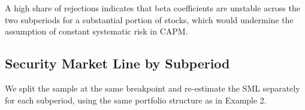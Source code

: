 \documentclass[
]{article}
\begin{document}
A high share of rejections indicates that beta coefficients are unstable across the two
subperiods for a substantial portion of stocks, which would undermine the assumption of
constant systematic risk in CAPM.

\subsection{Security Market Line by Subperiod}\label{security-market-line-by-subperiod}

We split the sample at the same breakpoint and re-estimate the SML separately for each
subperiod, using the same portfolio structure as in Example 2.
\end{document}
